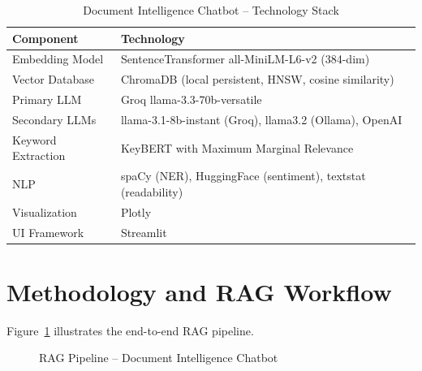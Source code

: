 \documentclass{book}
\begin{document}
\begin{table}[!h]
\begin{center}
\small
\begin{tabular}{|l|l|}
\hline
\textbf{Component} & \textbf{Technology} \\
\hline
Embedding Model & SentenceTransformer all-MiniLM-L6-v2 (384-dim) \\
Vector Database & ChromaDB (local persistent, HNSW, cosine similarity) \\
Primary LLM & Groq llama-3.3-70b-versatile \\
Secondary LLMs & llama-3.1-8b-instant (Groq), llama3.2 (Ollama), OpenAI \\
Keyword Extraction & KeyBERT with Maximum Marginal Relevance \\
NLP & spaCy (NER), HuggingFace (sentiment), textstat (readability) \\
Visualization & Plotly \\
UI Framework & Streamlit \\
\hline
\end{tabular}
\caption{Document Intelligence Chatbot -- Technology Stack}
\label{tab:meow_stack}
\end{center}
\end{table}

\section{Methodology and RAG Workflow}

\par\noindent Figure~\ref{fig:rag_flow} illustrates the end-to-end RAG pipeline.

\begin{figure}[ht]
\centering
{}
\caption{RAG Pipeline -- Document Intelligence Chatbot}
\label{fig:rag_flow}
\end{figure}
\end{document}

